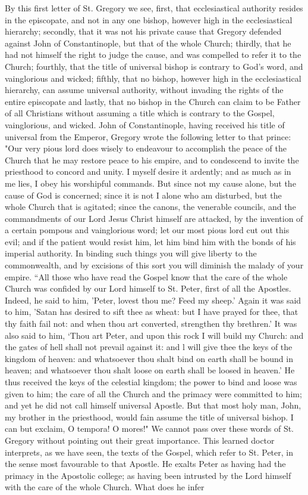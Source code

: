 By this first letter of St. Gregory we see, first, that ecclesiastical authority resides in the episcopate, and not in any one bishop, however high in the ecclesiastical hierarchy; secondly, that it was not his private cause that Gregory defended against John of Constantinople, but that of the whole Church; thirdly, that he had not himself the right to judge the cause, and was compelled to refer it to the Church; fourthly, that the title of universal bishop is contrary to God's word, and vainglorious and wicked; fifthly, that no bishop, however high in the ecclesiastical hierarchy, can assume universal authority, without invading the rights of the entire episcopate and lastly, that no bishop in the Church can claim to be Father of all Christians without assuming a title which is contrary to the Gospel, vainglorious, and wicked. John of Constantinople, having received his title of universal from the Emperor, Gregory wrote the following letter to that prince: "Our very pious lord does wisely to endeavour to accomplish the peace of the Church that he may restore peace to his empire, and to condescend to invite the priesthood to concord and unity. I myself desire it ardently; and as much as in me lies, I obey his worshipful commands. But since not my cause alone, but the cause of God is concerned; since it is not I alone who am disturbed, but the whole Church that is agitated; since the canons, the venerable councils, and the commandments of our Lord Jesus Christ himself are attacked, by the invention of a certain pompous and vainglorious word; let our most pious lord cut out this evil; and if the patient would resist him, let him bind him with the bonds of his imperial authority. In binding such things you will give liberty to the commonwealth, and by excisions of this sort you will diminish the malady of your empire. “All those who have read the Gospel know that the care of the whole Church was confided by our Lord himself to St. Peter, first of all the Apostles. Indeed, he said to him, 'Peter, lovest thou me? Feed my sheep.’ Again it was said to him, 'Satan has desired to sift thee as wheat: but I have prayed for thee, that thy faith fail not: and when thou art converted, strengthen thy brethren.' It was also said to him, ‘Thou art Peter, and upon this rock I will build my Church: and the gates of hell shall not prevail against it: and l will give thee the keys of the kingdom of heaven: and whatsoever thou shalt bind on earth shall be bound in heaven; and whatsoever thou shalt loose on earth shall be loosed in heaven.' He thus received the keys of the celestial kingdom; the power to bind and loose was given to him; the care of all the Church and the primacy were committed to him; and yet he did not call himself universal Apostle. But that most holy man, John, my brother in the priesthood, would fain assume the title of universal bishop. I can but exclaim, O tempora! O mores!" We cannot pass over these words of St. Gregory without pointing out their great importance. This learned doctor interprets, as we have seen, the texts of the Gospel, which refer to St. Peter, in the sense most favourable to that Apostle. He exalts Peter as having had the primacy in the Apostolic college; as having been intrusted by the Lord himself with the care of the whole Church. What does he infer 